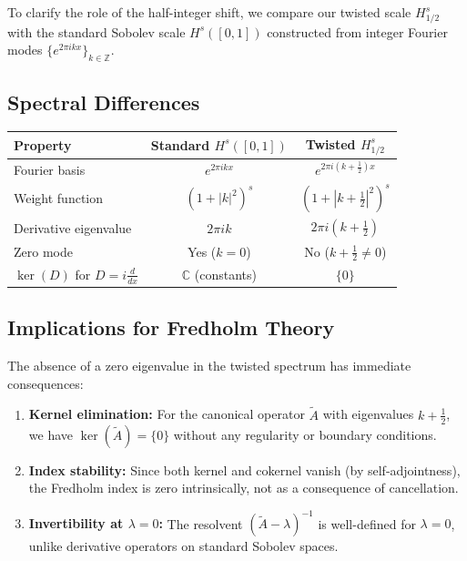 \documentclass[11pt]{amsart}
\theoremstyle{definition}
\theoremstyle{remark}
\begin{document}
To clarify the role of the half-integer shift, we compare our twisted scale $H^s_{1/2}$ with the standard Sobolev scale $H^s([0,1])$ constructed from integer Fourier modes $\{e^{2\pi i k x}\}_{k\in\mathbb{Z}}$.

\subsection{Spectral Differences}

\begin{center}
\begin{tabular}{lcc}
\hline
Property & Standard $H^s([0,1])$ & Twisted $H^s_{1/2}$ \\
\hline
Fourier basis & $e^{2\pi ikx}$ & $e^{2\pi i(k+\frac{1}{2})x}$ \\
Weight function & $(1+|k|^2)^s$ & $(1+|k+\tfrac{1}{2}|^2)^s$ \\
Derivative eigenvalue & $2\pi i k$ & $2\pi i(k+\tfrac{1}{2})$ \\
Zero mode & Yes ($k=0$) & No ($k+\tfrac{1}{2}\neq 0$) \\
$\ker(D)$ for $D=i\frac{d}{dx}$ & $\mathbb{C}$ (constants) & $\{0\}$ \\
\hline
\end{tabular}
\end{center}

\subsection{Implications for Fredholm Theory}

The absence of a zero eigenvalue in the twisted spectrum has immediate consequences:

\begin{enumerate}
\item \textbf{Kernel elimination:} For the canonical operator $\widetilde{A}$ with eigenvalues $k+\tfrac{1}{2}$, we have $\ker(\widetilde{A})=\{0\}$ without any regularity or boundary conditions.

\item \textbf{Index stability:} Since both kernel and cokernel vanish (by self-adjointness), the Fredholm index is zero intrinsically, not as a consequence of cancellation.

\item \textbf{Invertibility at $\lambda=0$:} The resolvent $(\widetilde{A}-\lambda)^{-1}$ is well-defined for $\lambda=0$, unlike derivative operators on standard Sobolev spaces.
\end{enumerate}
\end{document}
